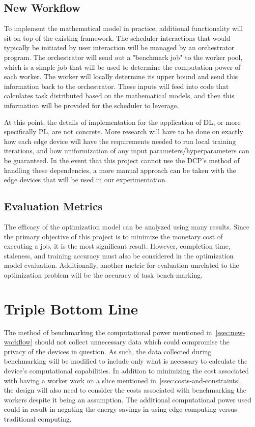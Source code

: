 \documentclass[../mthe-493-project-proposal.tex]{subfiles}
\begin{document}
    \subsection{New Workflow}
    \label{ssec:new-workflow}

    To implement the mathematical model in practice, additional functionality will sit on top of the existing framework. The scheduler interactions that would typically be initiated by user interaction will be managed by an orchestrator program. The orchestrator will send out a "benchmark job" to the worker pool, which is a simple job that will be used to determine the computation power of each worker. The worker will locally determine its upper bound and send this information back to the orchestrator. These inputs will feed into code that calculates task distributed based on the mathematical models, and then this information will be provided for the scheduler to leverage.
    
    At this point, the details of implementation for the application of DL, or more specifically PL, are not concrete. More research will have to be done on exactly how each edge device will have the requirements needed to run local training iterations, and how uniformization of any input parameters/hyperparameters can be guaranteed. In the event that this project cannot use the DCP's method of handling these dependencies, a more manual approach can be taken with the edge devices that will be used in our experimentation. 

    \subsection{Evaluation Metrics}

    The efficacy of the optimization model can be analyzed using many results. Since the primary objective of this project is to minimize the monetary cost of executing a job, it is the most significant result. However, completion time, staleness, and training accuracy must also be considered in the optimization model evaluation. Additionally, another metric for evaluation unrelated to the optimization problem will be the accuracy of task bench-marking.

    \section{Triple Bottom Line}
    The method of benchmarking the computational power mentioned in~\autoref{ssec:new-workflow} should not collect unnecessary data which could compromise the privacy of the devices in question. As such, the data collected during benchmarking will be modified to include only what is necessary to calculate the device's computational capabilities. In addition to minimizing the cost associated with having a worker work on a slice mentioned in~\autoref{ssec:costs-and-constraints}, the design will also need to consider the costs associated with benchmarking the workers despite it being an assumption. The additional computational power used could in result in negating the energy savings in using edge computing versus traditional computing.
\end{document}
